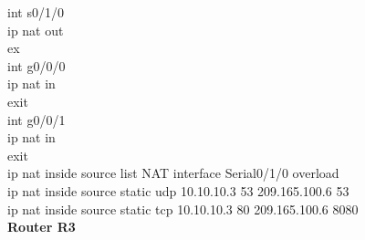 \documentclass[a4paper, 12pt]{article}
\begin{document}
{\hspace*{2cm}int s0/1/0\\
\hspace*{2cm}ip nat out\\
\hspace*{2cm}ex\\
\hspace*{2cm}int g0/0/0\\
\hspace*{2cm}ip nat in\\
\hspace*{2cm}exit\\
\hspace*{2cm}int g0/0/1\\
\hspace*{2cm}ip nat in\\
\hspace*{2cm}exit\\
\hspace*{2cm}ip nat inside source list NAT interface Serial0/1/0 overload\\
\hspace*{2cm}ip nat inside source static udp 10.10.10.3 53 209.165.100.6 53 \\
\hspace*{2cm}ip nat inside source static tcp 10.10.10.3 80 209.165.100.6 8080\\}
\hspace*{1cm}\textbf{Router R3}	\\
\end{document}
